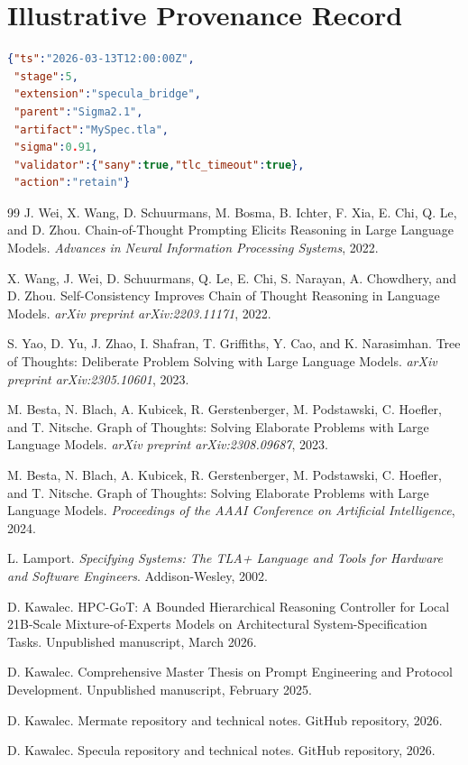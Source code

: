 \documentclass[11pt,a4paper,oneside]{article}
\begin{document}
\section{Illustrative Provenance Record}
\begin{lstlisting}[language=json,caption={Illustrative provenance JSONL event.}]
{"ts":"2026-03-13T12:00:00Z",
 "stage":5,
 "extension":"specula_bridge",
 "parent":"Sigma2.1",
 "artifact":"MySpec.tla",
 "sigma":0.91,
 "validator":{"sany":true,"tlc_timeout":true},
 "action":"retain"}
\end{lstlisting}

\begin{thebibliography}{99}
J. Wei, X. Wang, D. Schuurmans, M. Bosma, B. Ichter, F. Xia, E. Chi, Q. Le, and D. Zhou.
Chain-of-Thought Prompting Elicits Reasoning in Large Language Models.
\emph{Advances in Neural Information Processing Systems}, 2022.

X. Wang, J. Wei, D. Schuurmans, Q. Le, E. Chi, S. Narayan, A. Chowdhery, and D. Zhou.
Self-Consistency Improves Chain of Thought Reasoning in Language Models.
\emph{arXiv preprint arXiv:2203.11171}, 2022.

S. Yao, D. Yu, J. Zhao, I. Shafran, T. Griffiths, Y. Cao, and K. Narasimhan.
Tree of Thoughts: Deliberate Problem Solving with Large Language Models.
\emph{arXiv preprint arXiv:2305.10601}, 2023.

M. Besta, N. Blach, A. Kubicek, R. Gerstenberger, M. Podstawski, C. Hoefler, and T. Nitsche.
Graph of Thoughts: Solving Elaborate Problems with Large Language Models.
\emph{arXiv preprint arXiv:2308.09687}, 2023.

M. Besta, N. Blach, A. Kubicek, R. Gerstenberger, M. Podstawski, C. Hoefler, and T. Nitsche.
Graph of Thoughts: Solving Elaborate Problems with Large Language Models.
\emph{Proceedings of the AAAI Conference on Artificial Intelligence}, 2024.

L. Lamport.
\emph{Specifying Systems: The TLA+ Language and Tools for Hardware and Software Engineers}.
Addison-Wesley, 2002.

D. Kawalec.
HPC-GoT: A Bounded Hierarchical Reasoning Controller for Local 21B-Scale Mixture-of-Experts Models on Architectural System-Specification Tasks.
Unpublished manuscript, March 2026.

D. Kawalec.
Comprehensive Master Thesis on Prompt Engineering and Protocol Development.
Unpublished manuscript, February 2025.

D. Kawalec.
Mermate repository and technical notes.
GitHub repository, 2026.

D. Kawalec.
Specula repository and technical notes.
GitHub repository, 2026.
\end{thebibliography}
\end{document}
